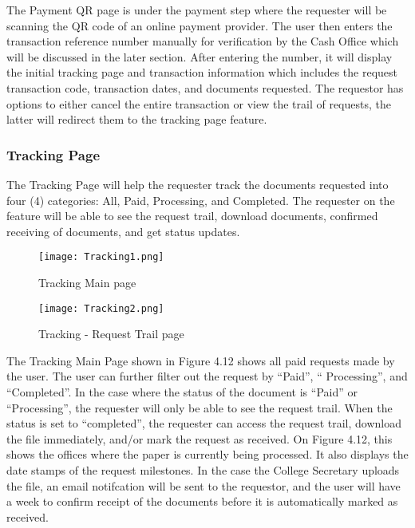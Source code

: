 The Payment QR page is under the payment step where the requester will be scanning the QR code of an online payment provider. The user then enters the transaction reference number manually for verification by the Cash Office which will be discussed in the later section. After entering the number, it will display the initial tracking page and transaction information which includes the request transaction code, transaction dates, and documents requested. The requestor has options to either cancel the entire transaction or view the trail of requests, the latter will redirect them to the tracking page feature.

\subsubsection{Tracking Page}

The Tracking Page will help the requester track the documents requested into four (4) categories: All, Paid, Processing, and Completed.  The requester on the feature will be able to see the request trail, download documents, confirmed receiving of documents, and get status updates.

    \begin{figure}[h]
        \centering 
        \begin{minipage}[c]{0.5\linewidth}
            \centering
            \texttt{[image: Tracking1.png]}
            \caption{Tracking Main page}
            \label{fig:Tracking1}
        \end{minipage}\hfill
        \begin{minipage}[c]{0.5\linewidth}
            \centering
            \texttt{[image: Tracking2.png]}
            \caption{Tracking - Request Trail page}
            \label{fig:Tracking2}
        \end{minipage}
    \end{figure}

The Tracking Main Page shown in Figure 4.12 shows all paid requests made by the user. The user can further filter out the request by “Paid”, “ Processing”, and “Completed”. In the case where the status of the document is “Paid” or “Processing”, the requester will only be able to see the request trail. When the status is set to “completed”, the requester can access the request trail, download the file immediately, and/or mark the request as received. On Figure 4.12, this shows the offices where the paper is currently being processed. It also displays the date stamps of the request milestones. In the case the College Secretary uploads the file, an email notifcation will be sent to the requestor, and the user will have a week to confirm receipt of the documents before it is automatically marked as received.

